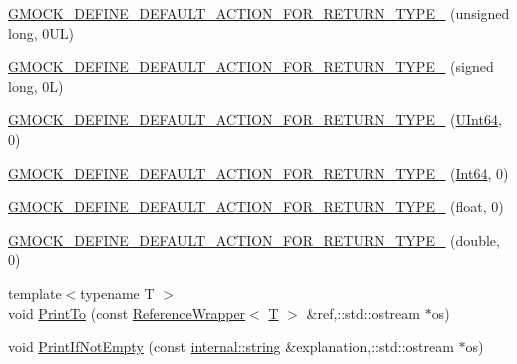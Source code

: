 \begin{DoxyCompactItemize}
\item 
\hyperlink{namespacetesting_1_1internal_a1f4167b954a7ff0074ce8a5bb855f86f}{G\+M\+O\+C\+K\+\_\+\+D\+E\+F\+I\+N\+E\+\_\+\+D\+E\+F\+A\+U\+L\+T\+\_\+\+A\+C\+T\+I\+O\+N\+\_\+\+F\+O\+R\+\_\+\+R\+E\+T\+U\+R\+N\+\_\+\+T\+Y\+P\+E\+\_\+} (unsigned long, 0\+U\+L)
\item 
\hyperlink{namespacetesting_1_1internal_ad8804e25537427755c324ab03a72e776}{G\+M\+O\+C\+K\+\_\+\+D\+E\+F\+I\+N\+E\+\_\+\+D\+E\+F\+A\+U\+L\+T\+\_\+\+A\+C\+T\+I\+O\+N\+\_\+\+F\+O\+R\+\_\+\+R\+E\+T\+U\+R\+N\+\_\+\+T\+Y\+P\+E\+\_\+} (signed long, 0\+L)
\item 
\hyperlink{namespacetesting_1_1internal_ad2efcdbd12c7c020745b87bcc0997809}{G\+M\+O\+C\+K\+\_\+\+D\+E\+F\+I\+N\+E\+\_\+\+D\+E\+F\+A\+U\+L\+T\+\_\+\+A\+C\+T\+I\+O\+N\+\_\+\+F\+O\+R\+\_\+\+R\+E\+T\+U\+R\+N\+\_\+\+T\+Y\+P\+E\+\_\+} (\hyperlink{namespacetesting_1_1internal_aa6a1ac454e6d7e550fa4925c62c35caa}{U\+Int64}, 0)
\item 
\hyperlink{namespacetesting_1_1internal_ab427739121a380a7934bda96153f053d}{G\+M\+O\+C\+K\+\_\+\+D\+E\+F\+I\+N\+E\+\_\+\+D\+E\+F\+A\+U\+L\+T\+\_\+\+A\+C\+T\+I\+O\+N\+\_\+\+F\+O\+R\+\_\+\+R\+E\+T\+U\+R\+N\+\_\+\+T\+Y\+P\+E\+\_\+} (\hyperlink{namespacetesting_1_1internal_a271c563fec38b804ddab0677f51f70a8}{Int64}, 0)
\item 
\hyperlink{namespacetesting_1_1internal_a71c697e5b567365fd3ff6c720769633b}{G\+M\+O\+C\+K\+\_\+\+D\+E\+F\+I\+N\+E\+\_\+\+D\+E\+F\+A\+U\+L\+T\+\_\+\+A\+C\+T\+I\+O\+N\+\_\+\+F\+O\+R\+\_\+\+R\+E\+T\+U\+R\+N\+\_\+\+T\+Y\+P\+E\+\_\+} (float, 0)
\item 
\hyperlink{namespacetesting_1_1internal_a7ba92aa33f4968c902623cd02e445020}{G\+M\+O\+C\+K\+\_\+\+D\+E\+F\+I\+N\+E\+\_\+\+D\+E\+F\+A\+U\+L\+T\+\_\+\+A\+C\+T\+I\+O\+N\+\_\+\+F\+O\+R\+\_\+\+R\+E\+T\+U\+R\+N\+\_\+\+T\+Y\+P\+E\+\_\+} (double, 0)
\item 
{\footnotesize template$<$typename T $>$ }\\void \hyperlink{namespacetesting_1_1internal_a880d891d434f918b29a382f90e47cecb}{Print\+To} (const \hyperlink{classtesting_1_1internal_1_1_reference_wrapper}{Reference\+Wrapper}$<$ \hyperlink{functions__7_8js_adf1f3edb9115acb0a1e04209b7a9937b}{T} $>$ \&ref,\+::std\+::ostream $\ast$os)
\item 
void \hyperlink{namespacetesting_1_1internal_a77c9e2b66d2b2414db4763971180d53c}{Print\+If\+Not\+Empty} (const \hyperlink{namespacetesting_1_1internal_a8e8ff5b11e64078831112677156cb111}{internal\+::string} \&explanation,\+::std\+::ostream $\ast$os)

\end{DoxyCompactItemize}
